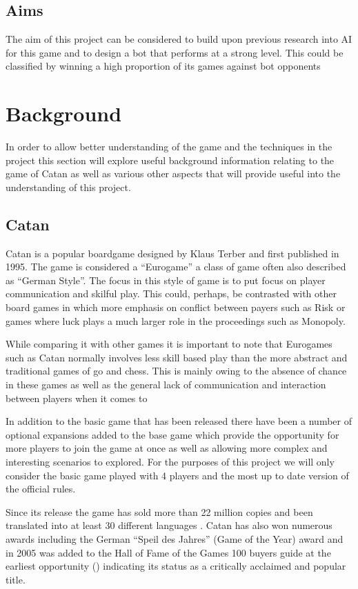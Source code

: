 \documentclass[]{article}
\let\oldsection\section
\renewcommand\section{\clearpage\oldsection}
\begin{document}
\subsection{Aims}
The aim of this project can be considered to build upon previous research into AI for this game and to design a bot that performs at a strong level. This could be classified by winning a high proportion of its games against bot opponents 


\section{Background}
In order to allow better understanding of the game and the techniques in the project this section will explore useful background information relating to the game of Catan as well as various other aspects that will provide useful into the understanding of this project.


\subsection{Catan}
Catan is a popular boardgame designed by Klaus Terber and first published in 1995. The game is considered a ``Eurogame'' a class of game often also described as ``German Style''. The focus in this style of game is to put focus on player communication and skilful play. This could, perhaps, be contrasted with other board games in which more emphasis on conflict between payers such as Risk or games where luck plays a much larger role in the proceedings such as Monopoly. 

\par While comparing it with other games it is important to note that Eurogames such as Catan normally involves less skill based play than the more abstract and traditional games of go and chess. This is mainly owing to the absence of chance in these games as well as the general lack of communication and interaction between players when it comes to 

\par In addition to the basic game that has been released there have been a number of optional expansions added to the base game which provide the opportunity for more players to join the game at once as well as allowing more complex and interesting scenarios to explored. For the purposes of this project we will only consider the basic game played with 4 players and the most up to date version of the official rules.

\par Since its release the game has sold more than 22 million copies and been translated into at least 30 different languages \autocite{variety2015}. Catan has also won numerous awards including the German ``Speil des Jahres'' (Game of the Year) award and in 2005 was added to the Hall of Fame of the Games 100 buyers guide at the earliest opportunity (\citeauthor{spielDesJahr}) indicating its status as a critically acclaimed and popular title.
\end{document}
